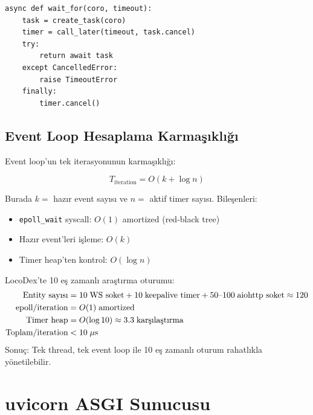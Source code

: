 \begin{lstlisting}[caption={wait\_for dahili implementasyonu (pseudo-code)},label={lst:wait-for}]
async def wait_for(coro, timeout):
    task = create_task(coro)
    timer = call_later(timeout, task.cancel)
    try:
        return await task
    except CancelledError:
        raise TimeoutError
    finally:
        timer.cancel()
\end{lstlisting}

\subsection{Event Loop Hesaplama Karma\c{s}{\i}kl{\i}\u{g}{\i}}
\label{sec:event-loop-complexity}

Event loop'un tek iterasyonunun karma\c{s}{\i}kl{\i}\u{g}{\i}:

\begin{equation}
\label{eq:event-loop-complexity}
T_{\mathrm{iteration}} = O(k + \log n)
\end{equation}

Burada $k =$ haz{\i}r event say{\i}s{\i} ve $n =$ aktif timer say{\i}s{\i}. Bile\c{s}enleri:

\begin{itemize}
  \item \texttt{epoll\_wait} syscall: $O(1)$ amortized (red-black tree)
  \item Haz{\i}r event'leri i\c{s}leme: $O(k)$
  \item Timer heap'ten kontrol: $O(\log n)$
\end{itemize}

\begin{ornek}
LocoDex'te 10 e\c{s} zamanl{\i} ara\c{s}t{\i}rma oturumu:
\begin{align*}
\text{Entity say{\i}s{\i}} &= 10 \;\text{WS soket} + 10 \;\text{keepalive timer} + 50\text{--}100 \;\text{aiohttp soket} \approx 120 \\
\text{epoll/iteration} &= O(1) \;\text{amortized} \\
\text{Timer heap} &= O(\log 10) \approx 3.3 \;\text{kar\c{s}{\i}la\c{s}t{\i}rma} \\
\text{Toplam/iteration} &< 10 \;\mu\text{s}
\end{align*}
Sonu\c{c}: Tek thread, tek event loop ile 10 e\c{s} zamanl{\i} oturum rahatl{\i}kla y\"{o}netilebilir.
\end{ornek}


\section{uvicorn ASGI Sunucusu}
\label{sec:uvicorn}

